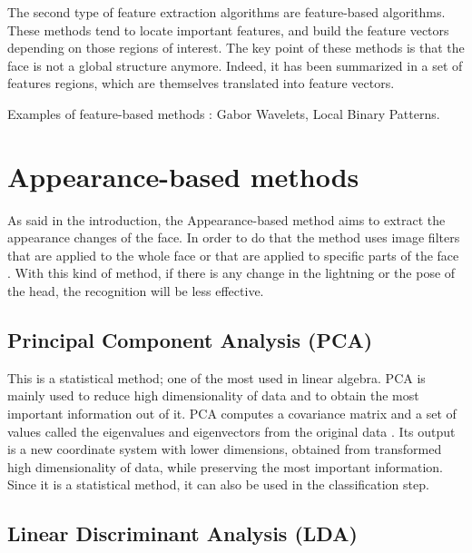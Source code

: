 \noindent The second type of feature extraction algorithms are feature-based algorithms. These methods tend to locate important features, and build the feature vectors depending on those regions of interest. The key point of these methods is that the face is not a global structure anymore. Indeed, it has been summarized in a set of features regions, which are themselves translated into feature vectors.
\vspace{\baselineskip}

\noindent Examples of feature-based methods : Gabor Wavelets, Local Binary Patterns.
\newline

\section{Appearance-based methods}

\noindent As said in the introduction, the Appearance-based method aims to extract the appearance changes of the face. In order to do that the method uses image filters that are applied to the whole face or that are applied to specific parts of the face \cite{SHA09}. With this kind of method, if there is any change in the lightning or the pose of the head, the recognition will be less effective.
\newline

\subsection{Principal Component Analysis (PCA)}

\vspace{\baselineskip}
\noindent This is a statistical method; one of the most used in linear algebra. PCA is mainly used to reduce high dimensionality of data and to obtain the most important information out of it. PCA computes a covariance matrix and a set of values called the eigenvalues and eigenvectors from the original data \cite{GAN08}. Its output is a new coordinate system with lower dimensions, obtained from transformed high dimensionality of data, while preserving the most important information.  Since it is a statistical method, it can also be used in the classification step.
\newline

\subsection{Linear Discriminant Analysis (LDA)}

